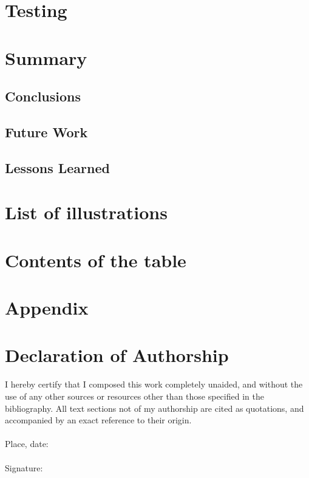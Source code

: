 \documentclass{scrartcl}
\begin{document}
\section{Testing}

\section{Summary}
\subsection{Conclusions}
\subsection{Future Work}
\subsection{Lessons Learned}

\section{List of illustrations}
\section{Contents of the table}
\section{Appendix}
\section{Declaration of Authorship}
I hereby certify that I composed this work completely unaided, and without the use of any other sources or resources other than those specified in the bibliography. All text sections not of my authorship are cited as quotations, and accompanied by an exact reference to their origin.\\
\\
Place, date:\\
\\

Signature:


\newpage

\end{document}
